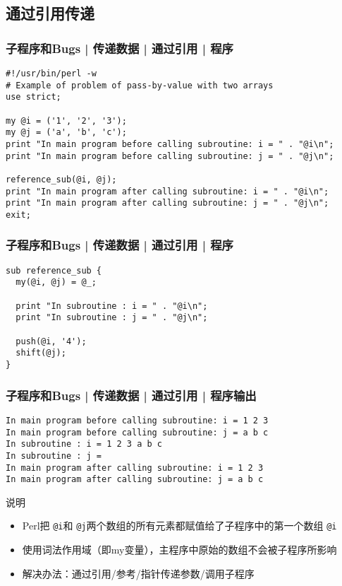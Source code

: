 \subsection{通过引用传递}
\begin{frame}[fragile]
  \frametitle{子程序和Bugs | 传递数据 | 通过引用 | 程序}
\begin{lstlisting}[basicstyle=\small\tt]
#!/usr/bin/perl -w
# Example of problem of pass-by-value with two arrays
use strict;

my @i = ('1', '2', '3');
my @j = ('a', 'b', 'c');
print "In main program before calling subroutine: i = " . "@i\n";
print "In main program before calling subroutine: j = " . "@j\n";

reference_sub(@i, @j);
print "In main program after calling subroutine: i = " . "@i\n";
print "In main program after calling subroutine: j = " . "@j\n";
exit;
\end{lstlisting}
\end{frame}

\begin{frame}[fragile]
  \frametitle{子程序和Bugs | 传递数据 | 通过引用 | 程序}
\begin{lstlisting}
sub reference_sub {
  my(@i, @j) = @_;

  print "In subroutine : i = " . "@i\n";
  print "In subroutine : j = " . "@j\n";

  push(@i, '4');
  shift(@j);
}
\end{lstlisting}
\end{frame}

\begin{frame}[fragile]
  \frametitle{子程序和Bugs | 传递数据 | 通过引用 | 程序输出}
\begin{lstlisting}[basicstyle=\footnotesize\tt]
In main program before calling subroutine: i = 1 2 3
In main program before calling subroutine: j = a b c
In subroutine : i = 1 2 3 a b c
In subroutine : j = 
In main program after calling subroutine: i = 1 2 3
In main program after calling subroutine: j = a b c
\end{lstlisting}
\begin{block}{说明}
  \begin{itemize}
    \item Perl把 \verb|@i|和 \verb|@j|两个数组的所有元素都赋值给了子程序中的第一个数组 \verb|@i|
    \item 使用词法作用域（即my变量），主程序中原始的数组不会被子程序所影响
    \item 解决办法：通过引用/参考/指针传递参数/调用子程序
  \end{itemize}
\end{block}
\end{frame}

